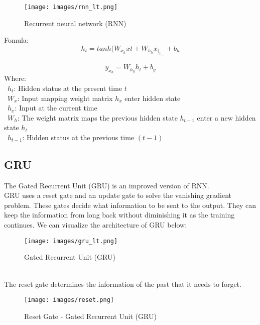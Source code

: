 \documentclass{ieeeojies}
\begin{document}
\begin{figure}[H]
  \centering
  \begin{minipage}{0.8\linewidth}
    \centering
    \texttt{[image: images/rnn\_lt.png]}
    \caption{Recurrent neural network (RNN)}
    \label{fig8}
  \end{minipage}
\end{figure}
Fomula:
\[h_t = tanh ( W_x_h xt + W_h_hx_(_t_-_1_) + b_h\]

\[y_x_h = W_h_yh_t + b_y\]
\indent Where:\\
\indent\textbullet\ $h_t$: 
Hidden status at the present time $t$\\
\indent\textbullet\ $W_x$: 
Input mapping weight matrix $h_x$ 
enter hidden state \\
\indent\textbullet\ $h_x$: Input at the current time \\
\indent\textbullet\ $W_h$: The weight matrix maps the previous hidden state $h_{t-1}$ enter a new hidden state $h_t$ \\
\indent\textbullet\ $h_{t-1}$: Hidden status at the previous time $(t-1)$

\subsection{GRU}
\indent The Gated Recurrent Unit (GRU) is an improved version of RNN.
\\
\indent GRU uses a reset gate and an update gate to solve the vanishing gradient problem. These gates decide what information to be sent to the output. They can keep the information from long back without diminishing it as the training continues. We can visualize the architecture of GRU below:
\begin{figure}[H]
  \centering
  \begin{minipage}{0.8\linewidth}
    \centering
    \texttt{[image: images/gru\_lt.png]}
    \caption{Gated Recurrent Unit (GRU)}
    \label{fig8}
  \end{minipage}
\end{figure}
\\
\indent The reset gate determines the information of the past that it needs to forget. 

\begin{figure}[H]
  \centering
  \begin{minipage}{0.8\linewidth}
    \centering
    \texttt{[image: images/reset.png]}
    \caption{Reset Gate - Gated Recurrent Unit (GRU)}
    \label{fig8}
  \end{minipage}
\end{figure}
\end{document}
